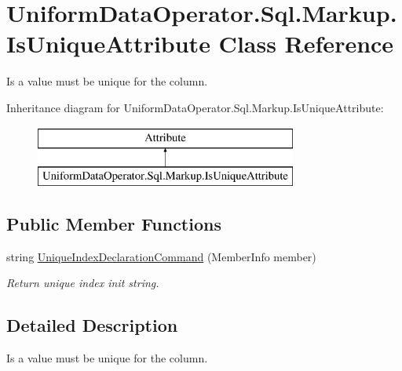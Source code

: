 \hypertarget{class_uniform_data_operator_1_1_sql_1_1_markup_1_1_is_unique_attribute}{}\section{Uniform\+Data\+Operator.\+Sql.\+Markup.\+Is\+Unique\+Attribute Class Reference}
\label{class_uniform_data_operator_1_1_sql_1_1_markup_1_1_is_unique_attribute}


Is a value must be unique for the column.  


Inheritance diagram for Uniform\+Data\+Operator.\+Sql.\+Markup.\+Is\+Unique\+Attribute\+:\begin{figure}[H]
\begin{center}
\leavevmode
\includegraphics[height=2.000000cm]{d0/d27/class_uniform_data_operator_1_1_sql_1_1_markup_1_1_is_unique_attribute}
\end{center}
\end{figure}
\subsection*{Public Member Functions}
\begin{DoxyCompactItemize}
\item 
string \mbox{\hyperlink{class_uniform_data_operator_1_1_sql_1_1_markup_1_1_is_unique_attribute_abe2b67c5dd704a30acfb0a2f55d8f858}{Unique\+Index\+Declaration\+Command}} (Member\+Info member)
\begin{DoxyCompactList}\small\item\em Return unique index init string. \end{DoxyCompactList}\end{DoxyCompactItemize}


\subsection{Detailed Description}
Is a value must be unique for the column. 



